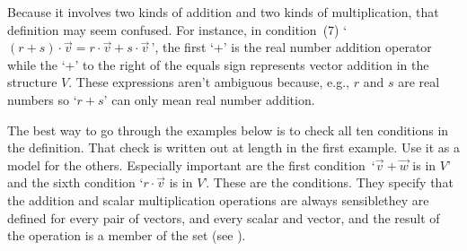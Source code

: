 
\begin{remark}
Because it involves two kinds of addition and two kinds of multiplication, 
that definition may seem confused.
For instance, in condition~(7)
`\( (r+s)\cdot\vec{v}=r\cdot\vec{v}+s\cdot\vec{v}\, \)',
the first `+' is the real number addition operator
while the `+' to the right of
the equals sign represents vector addition in the structure \( V \).
These expressions aren't ambiguous because, e.g.,
\( r \) and \( s \)
are real numbers so `\( r+s \)' can only mean real number addition.
\end{remark}

The best way to go through the examples below is to
check all ten conditions in the definition.
That check is written out at length in the first example.
Use it as a model for the others.
Especially important are the first 
condition~`\( \vec{v}+\vec{w} \) is in \( V \)' and
the sixth condition `\( r\cdot\vec{v} \) is in \( V \)'.
These are the 
conditions.
They specify that the addition and scalar multiplication operations
are always sensible\Dash they are defined for every pair of vectors, 
and every scalar and vector,
and the result of the operation is a member of the set
(see ). 

